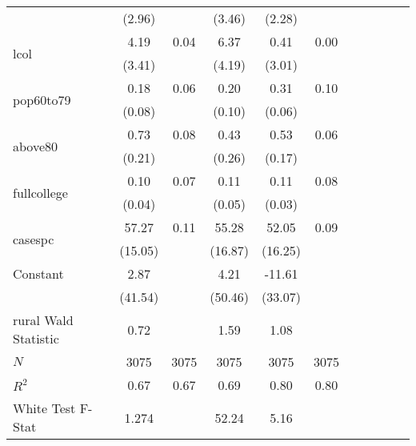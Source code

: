 \begin{minipage}{6.5in}
\begin{tabular*}{\textwidth}{@{\extracolsep{\fill}}l*{5}{cc}}
	            &      (2.96)         &            &      (3.46)         &      (2.28)         &            \\
	\multirow{2}{*}{lcol}        &        4.19         &        0.04&        6.37         &        0.41         &        0.00\\
	            &      (3.41)         &            &      (4.19)         &      (3.01)         &            \\
	\multirow{2}{*}{pop60to79}   &        0.18\sym{*}  &        0.06&        0.20\sym{*}  &        0.31\sym{***}&        0.10\\
	            &      (0.08)         &            &      (0.10)         &      (0.06)         &            \\
	\multirow{2}{*}{above80}     &        0.73\sym{***}&        0.08&        0.43         &        0.53\sym{**} &        0.06\\
	            &      (0.21)         &            &      (0.26)         &      (0.17)         &            \\
	\multirow{2}{*}{fullcollege} &        0.10\sym{*}  &        0.07&        0.11\sym{*}  &        0.11\sym{***}&        0.08\\
	            &      (0.04)         &            &      (0.05)         &      (0.03)         &            \\
	\multirow{2}{*}{casespc}&       57.27\sym{***}&        0.11&       55.28\sym{**} &       52.05\sym{**} &        0.09\\
	            &     (15.05)         &            &     (16.87)         &     (16.25)         &            \\
	Constant      &        2.87         &            &        4.21         &      -11.61         &            \\
	            &     (41.54)         &            &     (50.46)         &     (33.07)         &            \\
	rural Wald Statistic&0.72&&1.59&1.08&\\
	\hline
	\(N\)       &        3075         &        3075&        3075         &        3075         &        3075\\
	$R^2$&0.67&0.67&0.69&0.80&0.80\\
	White Test F-Stat&1.274&&52.24\sym{***}&5.16\sym{**}&\\
	\hline\hline
	\end{tabular*}

\end{minipage}
